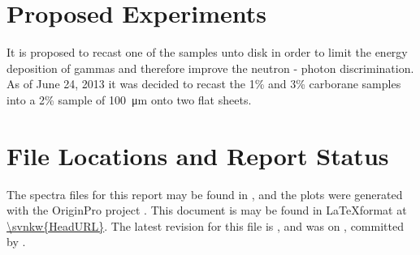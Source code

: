 \documentclass[draftcls,onecolumn]{IEEEtran}
\begin{document}
\section{Proposed Experiments}
It is proposed to recast one of the samples unto disk in order to limit the energy deposition of gammas and therefore improve the neutron - photon discrimination.
As of June 24, 2013 it was decided to recast the 1\% and 3\% carborane samples into a 2\% sample of \SI{100}{\um} onto two flat sheets.
\pagebreak
\appendices
\section{File Locations and Report Status}
The spectra files for this report may be found in , and the plots were generated with the OriginPro project .
This document is may be found in \LaTeX format at \url{\svnkw{HeadURL}}.  
The latest revision for this file is \svnrev, and was on \svndate, committed by \svnauthor.
\end{document}
